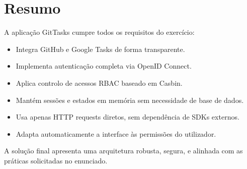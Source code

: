 \section{Resumo}

A aplicação GitTasks cumpre todos os requisitos do exercício:

\begin{itemize}
    \item Integra GitHub e Google Tasks de forma transparente.
    \item Implementa autenticação completa via OpenID Connect.
    \item Aplica controlo de acessos RBAC baseado em Casbin.
    \item Mantém sessões e estados em memória sem necessidade de base de dados.
    \item Usa apenas HTTP requests diretos, sem dependência de SDKs externos.
    \item Adapta automaticamente a interface às permissões do utilizador.
\end{itemize}

A solução final apresenta uma arquitetura robusta, segura, e alinhada com as práticas solicitadas no enunciado.
